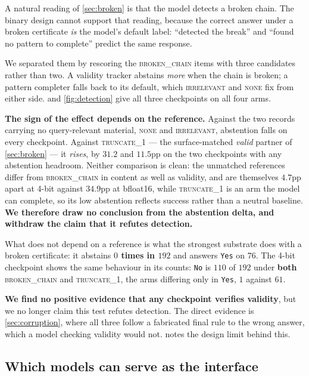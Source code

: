 \documentclass[10pt,twocolumn]{article}
\begin{document}
A natural reading of \cref{sec:broken} is that the model detects a broken chain.
The binary design cannot support that reading, because the correct answer under a
broken certificate \emph{is} the model's default label: ``detected the break'' and
``found no pattern to complete'' predict the same response.

We separated them by rescoring the \textsc{broken\_chain} items with three
candidates rather than two. A validity tracker abstains \emph{more} when the
chain is broken; a pattern completer falls back to its default, which
\textsc{irrelevant} and \textsc{none} fix from either side.
 and \cref{fig:detection} give all three checkpoints on all
four arms.

\textbf{The sign of the effect depends on the reference.} Against the two records
carrying no query-relevant material, \textsc{none} and \textsc{irrelevant},
abstention falls on every checkpoint. Against \textsc{truncate\_1} --- the
surface-matched \emph{valid} partner of \cref{sec:broken} --- it \emph{rises}, by
$31.2$ and $11.5$pp on the two checkpoints with any abstention headroom. Neither
comparison is clean: the unmatched references differ from \textsc{broken\_chain} in
content as well as validity, and are themselves $4.7$pp apart at 4-bit against
$34.9$pp at bfloat16, while \textsc{truncate\_1} is an arm the model can complete,
so its low abstention reflects success rather than a neutral baseline.
\textbf{We therefore draw no conclusion from the abstention delta, and withdraw
the claim that it refutes detection.}

What does not depend on a reference is what the strongest substrate does with a
broken certificate: it abstains \textbf{$0$ times in $192$} and answers
\texttt{Yes} on $76$. The 4-bit checkpoint shows the same behaviour in its counts:
\texttt{No} is $110$ of $192$ under \textbf{both} \textsc{broken\_chain} and
\textsc{truncate\_1}, the arms differing only in \texttt{Yes}, $1$ against $61$.

\textbf{We find no positive evidence that any checkpoint verifies validity}, but
we no longer claim this test refutes detection. The direct evidence is
\cref{sec:corruption}, where all three follow a fabricated final rule to the wrong
answer, which a model checking validity would not.  notes the design limit behind this.

\subsection{Which models can serve as the interface}
\end{document}

